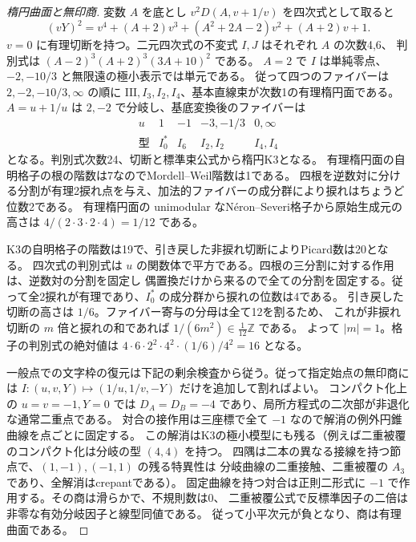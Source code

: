 \begin{proof}[楕円曲面と無印商]
変数 $A$ を底とし $v^2D(A,v+1/v)$ を四次式として取ると
\[
 (vY)^2=v^4+(A+2)v^3+(A^2+2A-2)v^2+(A+2)v+1 .
\]
$v=0$ に有理切断を持つ。二元四次式の不変式 $I,J$ はそれぞれ $A$ の次数4,6、
判別式は $(A-2)^3(A+2)^3(3A+10)^2$ である。
$A=2$ で $I$ は単純零点、$-2,-10/3$ と無限遠の極小表示では単元である。
従って四つのファイバーは $2,-2,-10/3,\infty$ の順に
$\mathrm{III},I_3,I_2,I_4$、基本直線束が次数1の有理楕円面である。
$A=u+1/u$ は $2,-2$ で分岐し、基底変換後のファイバーは
\[
\begin{array}{c|rrrr}
 u&1&-1&-3,-1/3&0,\infty\\\hline
 \text{型}&I_0^*&I_6&I_2,I_2&I_4,I_4
\end{array}
\]
となる。判別式次数24、切断と標準束公式から楕円K3となる。
有理楕円面の自明格子の根の階数は7なのでMordell--Weil階数は1である。
四根を逆数対に分ける分割が有理2捩れ点を与え、加法的ファイバーの成分群により捩れはちょうど位数2である。
有理楕円面の unimodular なNéron--Severi格子から原始生成元の高さは $4/(2\cdot3\cdot2\cdot4)=1/12$ である。

K3の自明格子の階数は19で、引き戻した非捩れ切断によりPicard数は20となる。
四次式の判別式は $u$ の関数体で平方である。四根の三分割に対する作用は、逆数対の分割を固定し
偶置換だけから来るので全ての分割を固定する。従って全2捩れが有理であり、$I_0^*$ の成分群から捩れの位数は4である。
引き戻した切断の高さは $1/6$。ファイバー寄与の分母は全て12を割るため、
これが非捩れ切断の $m$ 倍と捩れの和であれば $1/(6m^2)\in\frac1{12}\mathbb Z$ である。
よって $|m|=1$。格子の判別式の絶対値は
$4\cdot6\cdot2^2\cdot4^2\cdot(1/6)/4^2=16$ となる。

一般点での文字枠の復元は下記の剰余検査から従う。従って指定始点の無印商には
$I:(u,v,Y)\mapsto(1/u,1/v,-Y)$ だけを追加して割ればよい。
コンパクト化上の $u=v=-1,Y=0$ では $D_A=D_B=-4$ であり、局所方程式の二次部が非退化な通常二重点である。
対合の接作用は三座標で全て $-1$ なので解消の例外円錐曲線を点ごとに固定する。
この解消はK3の極小模型にも残る（例えば二重被覆のコンパクト化は分岐の型 $(4,4)$ を持つ。
四隅は二本の異なる接線を持つ節点で、$(1,-1),(-1,1)$ の残る特異性は
分岐曲線の二重接触、二重被覆の $A_3$ であり、全解消はcrepantである）。
固定曲線を持つ対合は正則二形式に $-1$ で作用する。その商は滑らかで、不規則数は0、
二重被覆公式で反標準因子の二倍は非零な有効分岐因子と線型同値である。
従って小平次元が負となり、商は有理曲面である。
\end{proof}

